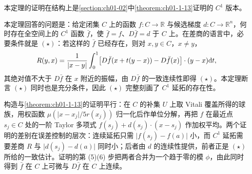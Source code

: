 \documentclass[../../main.tex]{subfiles}%
\begin{document}
本定理的证明在结构上是\cref{section:ch01-02}中\cref{theorem:ch01-1-13}证明的 $C^1$ 版本。%

\begin{remark}\label{remark:ch06-thm-6-10-动机}
本定理回答的问题是：给定闭集 $C$ 上的函数 $f:C\to\mathbb{R}$ 与候选梯度 $d:C\to\mathbb{R}^n$，何时存在全空间上的 $C^1$ 函数 $\bar f$，使 $\bar f=f$、$D\bar f=d$ 于 $C$ 上。在差商的语言中，必要条件就是 $(\star)$：若这样的 $\bar f$ 已经存在，则对 $x,y\in C$，$x\neq y$，
\begin{align*}
R(y,x)=\frac{1}{\lvert x-y\rvert}\int_0^1\bigl[D\bar f(x+t(y-x))-D\bar f(x)\bigr]\cdot(y-x)\mathrm{d} t,
\end{align*}
其绝对值不大于 $D\bar f$ 在 $x$ 附近的振幅，由 $D\bar f$ 的一致连续性即得 $(\star)$。本定理断言 $(\star)$ 同时也是充分条件，因此 $(\star)$ 完整刻画了 $C^1$ 延拓的存在性。

构造与\cref{theorem:ch01-1-13}的证明平行：在 $C$ 的补集 $U$ 上取 Vitali 覆盖所得的球族，用权函数 $\mu(\lvert x-x_j\rvert/5r(x_j))$ 归一化后作单位分解，再把 $f$ 在最近点 $s_j\in C$ 处的一阶 Taylor 多项式 $f(s_j)+d(s_j)\cdot(x-s_j)$ 作加权平均。两个证明的差别在误差控制的层次：连续延拓只需 $\lvert f(s_j)-f(a)\rvert$ 小，而 $C^1$ 延拓需要差商 $R$ 与 $\lvert d(s_j)-d(a)\rvert$ 同时小；后者由 $d$ 的连续性提供，前者正是 $(\star)$ 所给的一致估计。证明的第 (5)(6) 步把两者合并为一个趋于零的模 $\phi$，由此同时得到 $\bar f$ 在 $C$ 上可微与 $D\bar f$ 在 $C$ 上连续。%
\end{remark}
\end{document}
